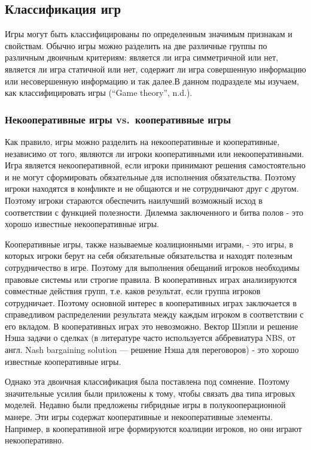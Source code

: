 \subsection{Классификация игр}

Игры могут быть классифицированы по определенным значимым признакам и
свойствам. Обычно игры можно разделить на две различные группы по
различным двоичным критериям: является ли игра симметричной или нет,
является ли игра статичной или нет, содержит ли игра совершенную
информацию или несовершенную информацию и так далее.В данном подразделе
мы изучаем, как классифицировать игры (``Game theory'', n.d.).

\subsubsection{Некооперативные игры vs.~кооперативные игры}

Как правило, игры можно разделить на некооперативные и кооперативные,
независимо от того, являются ли игроки кооперативными или
некооперативными. Игра является некооперативной, если игроки принимают
решения самостоятельно и не могут сформировать обязательные для
исполнения обязательства. Поэтому игроки находятся в конфликте и не
общаются и не сотрудничают друг с другом. Поэтому игроки стараются
обеспечить наилучший возможный исход в соответствии с функцией
полезности. Дилемма заключенного и битва полов - это хорошо известные
некооперативные игры.

Кооперативные игры, также называемые коалиционными играми, - это игры, в
которых игроки берут на себя обязательные обязательства и находят
полезным сотрудничество в игре. Поэтому для выполнения обещаний игроков
необходимы правовые системы или строгие правила. В кооперативных играх
анализируются совместные действия групп, т.е. каков результат, если
группа игроков сотрудничает. Поэтому основной интерес в кооперативных
играх заключается в справедливом распределении результата между каждым
игроком в соответствии с его вкладом. В кооперативных играх это
невозможно. Вектор Шэпли и решение Нэша задачи о сделках (в литературе
часто используется аббревиатура NBS, от англ. Nash bargaining solution
--- решение Нэша для переговоров) - это хорошо известные кооперативные
игры.

Однако эта двоичная классификация была поставлена под сомнение. Поэтому
значительные усилия были приложены к тому, чтобы связать два типа
игровых моделей. Недавно были предложены гибридные игры в
полукооперационной манере. Эти игры содержат кооперативные и
некооперативные элементы. Например, в кооперативной игре формируются
коалиции игроков, но они играют некооперативно.

